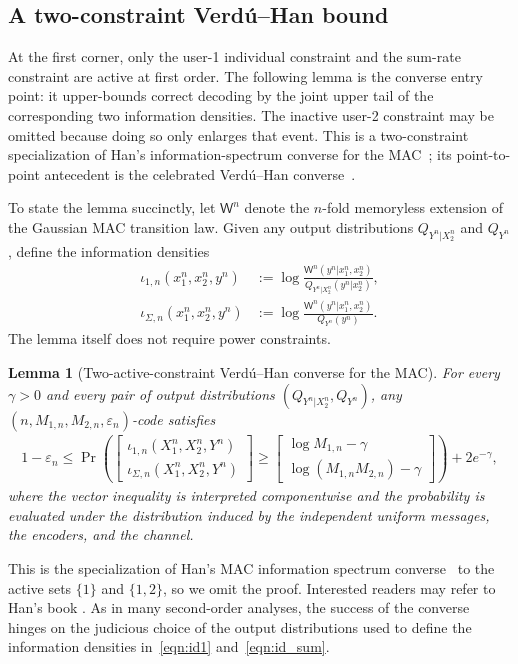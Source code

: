 \documentclass[11pt,onecolumn]{IEEEtran}
\newcommand{\rvW}{\mathsf{W}}
\newcommand{\eps}{\varepsilon}
\newtheorem{lemma}[theorem]{Lemma}
\begin{document}
\subsection{A two-constraint Verd\'u--Han bound}\label{sec:vh_bound}
At the first corner, only the user-1 individual constraint and the sum-rate constraint are active at
first order. The following lemma is the converse entry point: it upper-bounds correct decoding by
the joint upper tail of the corresponding two information densities. The inactive user-2 constraint
may be omitted because doing so only enlarges that event. This is a two-constraint specialization of Han's information-spectrum
converse for the MAC~\cite{Han98}; its point-to-point antecedent is the celebrated
Verd\'u--Han converse~\cite{VH94}.

To state the lemma succinctly,   let $\rvW^n$ denote the $n$-fold memoryless extension of the Gaussian
MAC transition law.  Given any   output distributions $Q_{Y^n|X_2^n}$ and $Q_{Y^n}$, define the information densities
\begin{align}
\iota_{1,n} (x_1^n,x_2^n,y^n) &:= \log \frac{\rvW^n(y^n|x_1^n,x_2^n)}{Q_{Y^n|X_2^n} (y^n|x_2^n)} , \label{eqn:id1}\\
\iota_{\Sigma,n} (x_1^n,x_2^n,y^n) &:= \log \frac{\rvW^n(y^n|x_1^n,x_2^n)}{Q_{Y^n} (y^n )} . \label{eqn:id_sum}
\end{align}
The lemma itself does not require power constraints.
\begin{lemma}[Two-active-constraint Verd\'u--Han converse for the MAC] \label{lem:vh} For every $\gamma>0$ and every pair of   output distributions $(Q_{Y^n|X_2^n},Q_{Y^n})$, any $(n,M_{1,n},M_{2,n},\eps_n)$-code satisfies 
\begin{align}
1-\eps_n\le\Pr \left(\begin{bmatrix}
\iota_{1,n} (X_1^n,X_2^n,Y^n) \\ \iota_{\Sigma,n} (X_1^n,X_2^n,Y^n)
\end{bmatrix} \ge \begin{bmatrix}
\log M_{1,n} -\gamma\\ \log (M_{1,n} M_{2,n}) -\gamma
\end{bmatrix} \right) + 2e^{-\gamma},
\end{align}
where the vector inequality is interpreted componentwise and the
probability is evaluated under the distribution induced by the
independent uniform messages, the encoders, and the channel.
\end{lemma}
This is the specialization of Han's MAC information spectrum converse~\cite{Han98} to the active sets
$\{1\}$ and $\{1,2\}$, so we omit the proof.  Interested readers may refer to Han's book \cite[Theorem 7.10.2]{Han10}. As in many second-order analyses, the success of the converse hinges on the judicious choice of the   output distributions used to define the information densities in~\eqref{eqn:id1} and~\eqref{eqn:id_sum}.
\end{document}
